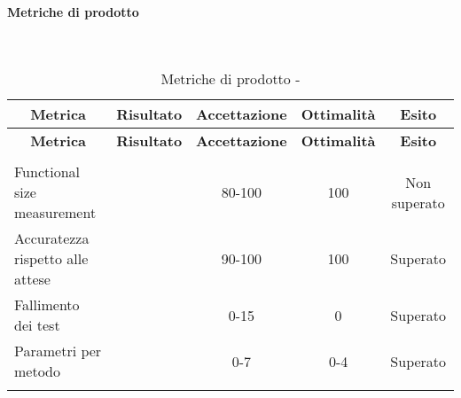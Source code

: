 \paragraph{Metriche di prodotto}\mbox{}\\
\begin{longtable}{|m{5cm}|c|c|c|c|}
	\hline \multicolumn{1}{|c|}{\textbf{Metrica}} & \multicolumn{1}{c|}{\textbf{Risultato}} & \multicolumn{1}{c|}{\textbf{Accettazione}} & \multicolumn{1}{c|}{\textbf{Ottimalità}} & \multicolumn{1}{c|}{\textbf{Esito}}\\
	\hline 
	\endfirsthead
	
	\hline \multicolumn{1}{|c|}{\textbf{Metrica}} & \multicolumn{1}{c|}{\textbf{Risultato}} & \multicolumn{1}{c|}{\textbf{Accettazione}} & \multicolumn{1}{c|}{\textbf{Ottimalità}} & \multicolumn{1}{c|}{\textbf{Esito}}\\
	\hline 
	\endhead
	
	\hline \multicolumn{5}{|r|}{\ToBeContinued} \\ 
	\hline
	\endfoot
	
	\endlastfoot
	
	\hline Functional size measurement &  & 80-100 & 100 & Non superato \\
	\hline Accuratezza rispetto alle attese &  & 90-100 & 100 & Superato\\
	\hline Fallimento dei test &  & 0-15 & 0 & Superato \\
	\hline Parametri per metodo &  & 0-7 & 0-4 & Superato \\
	\hline
	\caption{Metriche di prodotto - \RQ{}}
\end{longtable}
